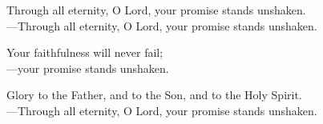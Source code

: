 \responsory

\noindent Through all eternity, O Lord, your promise stands unshaken.\\
{\color{red}---\thinspace}Through all eternity, O Lord, your promise stands unshaken.

\medskip\noindent Your faithfulness will never fail;\\
{\color{red}---\thinspace}your promise stands unshaken.

\medskip\noindent Glory to the Father, and to the Son, and to the Holy Spirit.\\
{\color{red}---\thinspace}Through all eternity, O Lord, your promise stands unshaken.